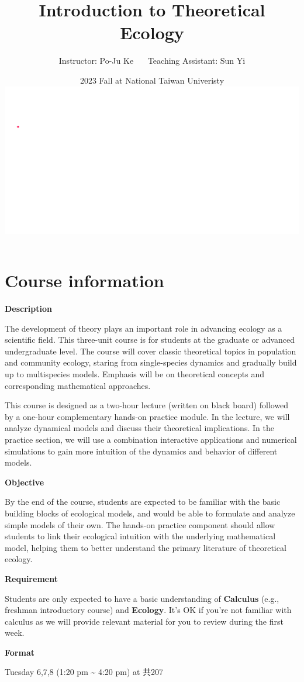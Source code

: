\documentclass[
]{book}
\title{Introduction to Theoretical Ecology}
\author{Instructor: Po-Ju Ke \(~~~~~\) Teaching Assistant: Sun Yi}
\date{2023 Fall at National Taiwan Univeristy \includegraphics{./bifurcation.gif}}
\begin{document}
\maketitle

{
\setcounter{tocdepth}{1}
\tableofcontents
}
\hypertarget{course-information}{%
\chapter*{Course information}\label{course-information}}

\textbf{Description}

The development of theory plays an important role in advancing ecology as a scientific field. This three-unit course is for students at the graduate or advanced undergraduate level. The course will cover classic theoretical topics in population and community ecology, staring from single-species dynamics and gradually build up to multispecies models. Emphasis will be on theoretical concepts and corresponding mathematical approaches.

This course is designed as a two-hour lecture (written on black board) followed by a one-hour complementary hands-on practice module. In the lecture, we will analyze dynamical models and discuss their theoretical implications. In the practice section, we will use a combination interactive applications and numerical simulations to gain more intuition of the dynamics and behavior of different models.

\textbf{Objective}

By the end of the course, students are expected to be familiar with the basic building blocks of ecological models, and would be able to formulate and analyze simple models of their own. The hands-on practice component should allow students to link their ecological intuition with the underlying mathematical model, helping them to better understand the primary literature of theoretical ecology.

\textbf{Requirement}

Students are only expected to have a basic understanding of \textbf{Calculus} (e.g., freshman introductory course) and \textbf{Ecology}. It's OK if you're not familiar with calculus as we will provide relevant material for you to review during the first week.

\textbf{Format}

Tuesday 6,7,8 (1:20 pm \textasciitilde{} 4:20 pm) at 共207
\end{document}
